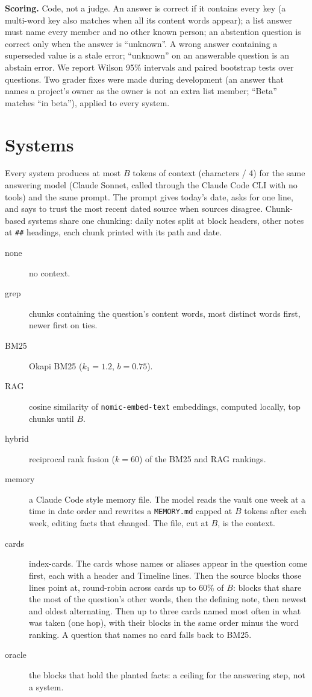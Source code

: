 \documentclass[11pt]{article}
\begin{document}
\textbf{Scoring.} Code, not a judge. An answer is correct if it contains every key (a multi-word key also matches
when all its content words appear); a list answer must name every member and no other known person; an abstention
question is correct only when the answer is ``unknown''. A wrong answer containing a superseded value is a stale
error; ``unknown'' on an answerable question is an abstain error. We report Wilson 95\% intervals and paired
bootstrap tests over questions. Two grader fixes were made during development (an answer that names a project's
owner as the owner is not an extra list member; ``Beta'' matches ``in beta''), applied to every system.

\section{Systems}\label{sec:systems}

Every system produces at most $B$ tokens of context (characters / 4) for the same answering model (Claude Sonnet,
called through the Claude Code CLI with no tools) and the same prompt. The prompt gives today's date, asks for one
line, and says to trust the most recent dated source when sources disagree. Chunk-based systems share one chunking:
daily notes split at block headers, other notes at \texttt{\#\#} headings, each chunk printed with its path and date.

\begin{description}
\item[none] no context.
\item[grep] chunks containing the question's content words, most distinct words first, newer first on ties.
\item[BM25] Okapi BM25 ($k_1=1.2$, $b=0.75$).
\item[RAG] cosine similarity of \texttt{nomic-embed-text} embeddings, computed locally, top chunks until $B$.
\item[hybrid] reciprocal rank fusion ($k=60$) of the BM25 and RAG rankings.
\item[memory] a Claude Code style memory file. The model reads the vault one week at a time in date order and
rewrites a \texttt{MEMORY.md} capped at $B$ tokens after each week, editing facts that changed. The file, cut at
$B$, is the context.
\item[cards] index-cards. The cards whose names or aliases appear in the question come first, each with a header and
Timeline lines. Then the source blocks those lines point at, round-robin across cards up to 60\% of $B$: blocks that
share the most of the question's other words, then the defining note, then newest and oldest alternating. Then up to
three cards named most often in what was taken (one hop), with their blocks in the same order minus the word
ranking. A question that names no card falls back to BM25.
\item[oracle] the blocks that hold the planted facts: a ceiling for the answering step, not a system.
\end{description}
\end{document}
